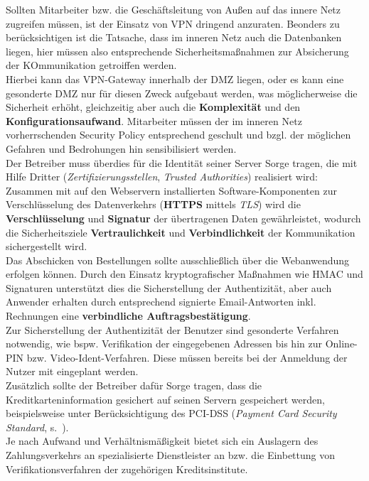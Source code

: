 \noindent
Sollten Mitarbeiter bzw. die Geschäftsleitung von Außen auf das innere Netz zugreifen müssen, ist der Einsatz von VPN dringend anzuraten. Beonders zu berücksichtigen ist die Tatsache, dass im inneren Netz auch die Datenbanken liegen, hier müssen also entsprechende Sicherheitsmaßnahmen zur Absicherung der KOmmunikation getroiffen werden.\\
Hierbei kann das VPN-Gateway innerhalb der DMZ liegen, oder es kann eine gesonderte DMZ nur für diesen Zweck aufgebaut werden, was möglicherweise die Sicherheit erhöht, gleichzeitig aber auch die \textbf{Komplexität} und den \textbf{Konfigurationsaufwand}.
Mitarbeiter müssen der im inneren Netz vorherrschenden Security Policy entsprechend geschult und bzgl. der möglichen Gefahren und Bedrohungen hin sensibilisiert werden.\\

\noindent
Der Betreiber muss überdies für die Identität seiner Server Sorge tragen, die mit Hilfe Dritter (\textit{Zertifizierungsstellen}, \textit{Trusted Authorities}) realisiert wird: Zusammen mit auf den Webservern installierten Software-Komponenten zur Verschlüsselung des Datenverkehrs (\textbf{HTTPS} mittels \textit{TLS}) wird die \textbf{Verschlüsselung} und \textbf{Signatur} der übertragenen Daten gewährleistet, wodurch die Sicherheitsziele \textbf{Vertraulichkeit} und \textbf{Verbindlichkeit} der Kommunikation sichergestellt wird.\\

\noindent
Das Abschicken von Bestellungen sollte ausschließlich über die Webanwendung erfolgen können.
Durch den Einsatz kryptografischer Maßnahmen wie HMAC und Signaturen unterstützt dies die Sicherstellung der Authentizität, aber auch Anwender erhalten durch entsprechend signierte Email-Antworten inkl. Rechnungen eine \textbf{verbindliche Auftragsbestätigung}.\\

\noindent
Zur Sicherstellung der Authentizität der Benutzer sind gesonderte Verfahren notwendig, wie bspw. Verifikation der eingegebenen Adressen bis hin zur Online-PIN bzw. Video-Ident-Verfahren. Diese müssen bereits bei der Anmeldung der Nutzer mit eingeplant werden.\\
Zusätzlich sollte der Betreiber dafür Sorge tragen, dass die Kreditkarteninformation gesichert auf seinen Servern gespeichert werden, beispielsweise unter Berücksichtigung des PCI-DSS (\textit{Payment Card Security Standard}, s.~\cite[57 ff.]{ITS1}).\\
Je nach Aufwand und Verhältnismäßigkeit bietet sich ein Auslagern des Zahlungsverkehrs an spezialisierte Dienstleister an bzw. die Einbettung von Verifikationsverfahren der zugehörigen Kreditsinstitute.\\

